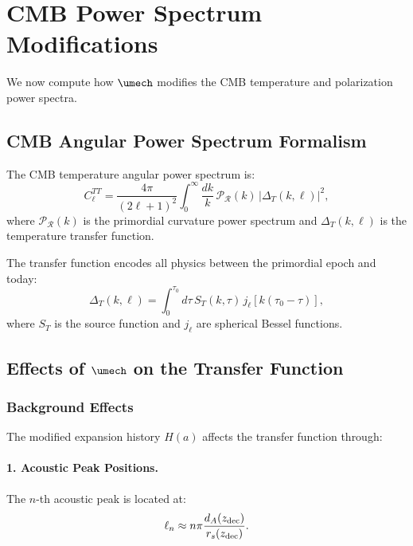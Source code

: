 
\section{CMB Power Spectrum Modifications}
\label{sec:cmb_spectrum}

We now compute how $\umech$ modifies the CMB temperature and polarization power spectra.

\subsection{CMB Angular Power Spectrum Formalism}
\label{sec:cmb_formalism}

The CMB temperature angular power spectrum is:
\begin{equation}
\label{eq:Cl_TT}
C_\ell^{TT} = \frac{4\pi}{(2\ell+1)^2} \int_0^\infty \frac{dk}{k} \, \mathcal{P}_\mathcal{R}(k) \, |\Delta_T(k,\ell)|^2,
\end{equation}
where $\mathcal{P}_\mathcal{R}(k)$ is the primordial curvature power spectrum and $\Delta_T(k,\ell)$ is the temperature transfer function.

The transfer function encodes all physics between the primordial epoch and today:
\begin{equation}
\Delta_T(k,\ell) = \int_0^{\tau_0} d\tau \, S_T(k,\tau) \, j_\ell[k(\tau_0 - \tau)],
\end{equation}
where $S_T$ is the source function and $j_\ell$ are spherical Bessel functions.

\subsection{Effects of $\umech$ on the Transfer Function}
\label{sec:transfer_function}

\subsubsection{Background Effects}

The modified expansion history $H(a)$ affects the transfer function through:

\paragraph{1. Acoustic Peak Positions.}
The $n$-th acoustic peak is located at:
\begin{equation}
\label{eq:peak_position}
\ell_n \approx n\pi \frac{d_A(z_{\mathrm{dec}})}{r_s(z_{\mathrm{dec}})}.
\end{equation}

